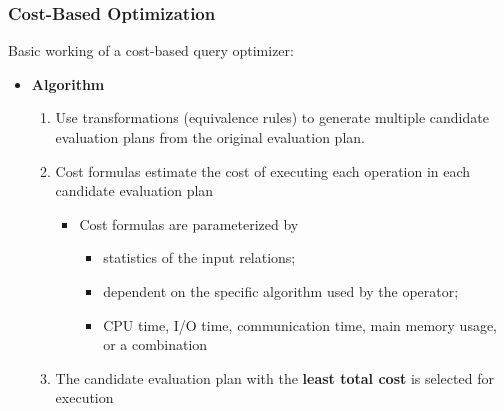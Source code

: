 \subsubsection{Cost-Based Optimization}
Basic working of a cost-based query optimizer:
\begin{itemize}[label=\(\rhd\)]
    \item \textbf{Algorithm}
    \begin{enumerate}
        \item Use transformations (equivalence rules) to generate multiple candidate evaluation plans from the original evaluation plan.
        \item Cost formulas estimate the cost of executing each operation in each candidate evaluation plan
        \begin{itemize}[label=\(\rhd\)]
            \item Cost formulas are parameterized by
            \begin{itemize}[label=\(\rhd\)]
                \item statistics of the input relations;
                \item dependent on the specific algorithm used by the operator;
                \item CPU time, I/O time, communication time, main memory usage, or a combination
            \end{itemize}
        \end{itemize}
        \item The candidate evaluation plan with the \textbf{least total cost} is selected for execution
    \end{enumerate}
\end{itemize}

